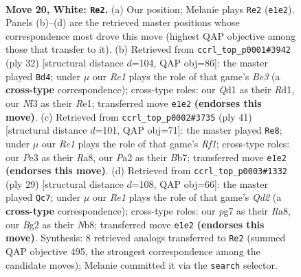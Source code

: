 \documentclass[11pt]{article}
\begin{document}
\clearpage

\begin{figure}[p]\centering
\begin{subfigure}{0.46\textwidth}\centering
\resizebox{\linewidth}{!}{%
\newchessgame
\chessboard[
  setfen={r1bnr3/1pppkppp/p2q4/B2P4/4n3/4PNP1/PP3PBP/1R1QR1K1 w - - 15 20},
  showmover=false,
  pgfstyle=straightmove, color=movearrow, markmove={e1-e2}
]}
\caption{}
\end{subfigure}\hfill
\begin{subfigure}{0.46\textwidth}\centering
\resizebox{\linewidth}{!}{%
\newchessgame
\chessboard[
  setfen={r3rbk1/5ppp/p1ppqn2/1p6/4P3/1PN1BP1P/P1PQ2P1/3RR1K1 w - - 0 17},
  showmover=false,
  pgfstyle=straightmove, color=movearrow, markmove={e3-d4}
]}
\caption{}
\end{subfigure}
\\[4pt]
\begin{subfigure}{0.46\textwidth}\centering
\resizebox{\linewidth}{!}{%
\newchessgame
\chessboard[
  setfen={r2q1rk1/1bp2pp1/1p1p1n1p/pN6/P1PP4/6Q1/1P3PPP/2R1RBK1 b - - 2 21},
  showmover=false,
  pgfstyle=straightmove, color=movearrow, markmove={f8-e8}
]}
\caption{}
\end{subfigure}\hfill
\begin{subfigure}{0.46\textwidth}\centering
\resizebox{\linewidth}{!}{%
\newchessgame
\chessboard[
  setfen={rn2kr2/pp1qn3/3b1pp1/4p2p/2PpP2N/5QNP/P2P1PP1/R1B2RK1 b q - 0 15},
  showmover=false,
  pgfstyle=straightmove, color=movearrow, markmove={d7-c7}
]}
\caption{}
\end{subfigure}
\caption{\textbf{Move 20, White: \texttt{Re2}.} (a) Our position; Melanie plays \texttt{Re2} (\texttt{e1e2}). Panels (b)--(d) are the retrieved master positions whose correspondence most drove this move (highest QAP objective among those that transfer to it). (b) Retrieved from \texttt{ccrl\_top\_p0001\#3942} (ply 32) [structural distance $d$=104, QAP obj=86]: the master played \texttt{Bd4}; under $\mu$ our \emph{Re1} plays the role of that game's \emph{Be3} (a \textbf{cross-type} correspondence); cross-type roles: our \emph{Q}d1 as their \emph{R}d1, our \emph{N}f3 as their \emph{R}e1; transferred move \texttt{e1e2} \textbf{(endorses this move)}. (c) Retrieved from \texttt{ccrl\_top\_p0002\#3735} (ply 41) [structural distance $d$=101, QAP obj=71]: the master played \texttt{Re8}; under $\mu$ our \emph{Re1} plays the role of that game's \emph{Rf1}; cross-type roles: our \emph{P}e3 as their \emph{R}a8, our \emph{P}a2 as their \emph{B}b7; transferred move \texttt{e1e2} \textbf{(endorses this move)}. (d) Retrieved from \texttt{ccrl\_top\_p0003\#1332} (ply 29) [structural distance $d$=108, QAP obj=66]: the master played \texttt{Qc7}; under $\mu$ our \emph{Re1} plays the role of that game's \emph{Qd2} (a \textbf{cross-type} correspondence); cross-type roles: our \emph{p}g7 as their \emph{R}a8, our \emph{B}g2 as their \emph{N}b8; transferred move \texttt{e1e2} \textbf{(endorses this move)}. Synthesis: 8 retrieved analogs transferred to \texttt{Re2} (summed QAP objective 495, the strongest correspondence among the candidate moves); Melanie committed it via the \texttt{search} selector.}
\label{fig:thought-m38}
\end{figure}
\end{document}

